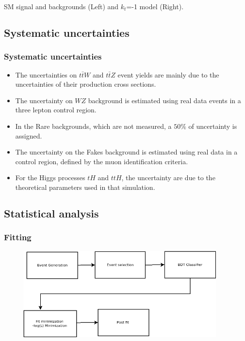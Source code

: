 \documentclass[11pt]{beamer}
\begin{document}
{\begin{frame}
\begin{minipage}[b]{.48\textwidth}
\begin{figure}
	\end{figure}
\end{minipage}
\begin{center}
\small{SM signal and backgrounds (Left) and $k_t$=-1 model (Right).}
\end{center}
\end{frame}
}


\begin{frame}
\subsection{Systematic uncertainties}
\frametitle{Systematic uncertainties}
\begin{itemize}
	\item The uncertainties on $t\bar{t}W$ and $t\bar{t}Z$ event yields are mainly due to the uncertainties of their production cross sections. 
	\item The uncertainty on $WZ$ background is estimated using real data events in a three lepton control region. 
	\item In the Rare backgrounds, which are not measured, a $50\%$ of uncertainty is assigned.
	\item The uncertainty on the Fakes background is estimated using real data in a control region, defined by the muon identification criteria. 
	\item For the Higgs processes $tH$ and $ttH$, the uncertainty are due to the theoretical parameters used in that simulation.
\end{itemize}

\end{frame}





\begin{frame}
\section{Statistical analysis}
\frametitle{Fitting}
	\begin{center}
	\begin{figure}
		\includegraphics[width=10.5cm]{figures/fit-box.png}
		\caption*{}
	\end{figure}
\end{center}
\end{frame}
\end{document}
